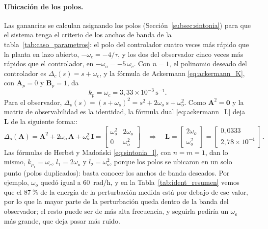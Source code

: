 \paragraph{Ubicación de los polos.} Las ganancias se calculan asignando los polos (Sección~\ref{subsec:sintonia}) para que el sistema tenga el criterio de los anchos de banda de la tabla~\ref{tab:caso_parametros}: el polo del controlador cuatro veces más rápido
que la planta en lazo abierto, $-\omega_c = -4/\tau$, y los dos del observador
cinco veces más rápidos que el controlador, en $-\omega_o = -5\,\omega_c$. Con
$n = 1$, el polinomio deseado del controlador es $\Delta_c(s) = s + \omega_c$, y
la fórmula de Ackermann \eqref{eq:ackermann_K}, con $\mathbf{A}_p = 0$ y
$\mathbf{B}_p = 1$, da
\begin{equation}
k_p  = \omega_c = 3{,}33\times10^{-3}~\text{s}^{-1}.
\end{equation}
Para el observador, $\Delta_o(s) = (s + \omega_o)^2 = s^2 + 2\omega_o\,s + \omega_o^2$.
Como $\mathbf{A}^2 = \mathbf{0}$ y la matriz de observabilidad es la identidad,
la fórmula dual \eqref{eq:ackermann_L} deja $\mathbf{L}$ de la siguiente forma::
\begin{equation}
\Delta_o(\mathbf{A}) = \mathbf{A}^2 + 2\omega_o\,\mathbf{A} + \omega_o^2\,\mathbf{I}
= \begin{bmatrix} \omega_o^2 & 2\omega_o \\ 0 & \omega_o^2 \end{bmatrix}
\quad\Longrightarrow\quad
\mathbf{L} = \begin{bmatrix} 2\omega_o \\ \omega_o^2 \end{bmatrix}
= \begin{bmatrix} 0{,}0333 \\ 2{,}78\times10^{-4} \end{bmatrix}.
\end{equation}
Las fórmulas de Herbst y Madoński \eqref{eq:sintonia_l}, con $n = m = 1$, dan lo
mismo, $k_{p_1} = \omega_c$, $l_1 = 2\omega_o$ y $l_2 = \omega_o^2$, porque los
polos se ubicaron en un solo punto (polos duplicados): basta conocer los anchos de banda deseados. Por ejemplo, $\omega_o$ quedó
igual a $60$~rad/h, y en la Tabla~\ref{tab:ident_resumen} vemos que el $87~\%$ de la energía de la
perturbación medida está por debajo de ese valor, por lo que la mayor parte de la perturbación queda dentro de
la banda del observador; el resto puede ser de más alta frecuencia, y seguirla pediría un $\omega_o$ más grande, que deja pasar más ruido.

